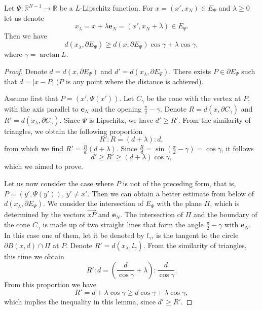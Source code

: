 \documentclass[10pt,a4paper]{amsart}
\begin{document}
\begin{lemma}\label{LE.DISTANCE.FROM.GRAPH}
Let $\Psi: \mathbb{R}^{N-1}\to\mathbb{R}$ be a $L$-Lipschitz function.   For $x = (x',x_N)\in E_\Psi$ and $\lambda\ge 0$
let us denote
\begin{equation*}
x_\lambda  =  x  + \lambda \mathbf {e}_N= (x', x_N + \lambda)\in E_\Psi.
\end{equation*}
Then we have
\begin{equation*}
d(x_\lambda, \partial E_\Psi) \ge d(x, \partial E_\Psi) \cos \gamma +  {\lambda\cos \gamma},
\end{equation*}
where  $\gamma  = \arctan L$.
\end{lemma}

\begin{proof}
Denote  $d  =  d(x, \partial E_\Psi)$   and   $d'= d(x_\lambda, \partial E_\Psi)$.   There exists $P\in \partial E_\Psi$
such that $ d = |x - P|$  ($P$ is any point where the distance is achieved).

Assume first that $P = (x', \Psi (x'))$. Let $C_\gamma$ be the cone with the vertex at  $P$,   with the axis parallel to
$\mathbf{e}_N$ and the opening $\frac {\pi}2-\gamma$.                          Denote $R = d(x, \partial C_\gamma) $ and
$R'= d(x_\lambda,  \partial C_\gamma)$.     Since $\Psi$ is Lipschitz,    we have $d'\ge  R'$.   From the similarity  of
triangles,  we obtain the following proportion
\begin{equation*}
R': R = (d+\lambda):d,
\end{equation*}
from which  we  find    $R'  = \frac R d (d+\lambda)$. Since $\frac Rd = \sin (\frac \pi 2 - \gamma) = \cos \gamma$,  it
follows
\begin{equation*}
d'\ge R'\ge (d +\lambda)\cos \gamma,
\end{equation*}
which we aimed to prove.

Let us now  consider the case where $P$ is not of the preceding form, that is, $P =(y', \Psi (y'))$, $y'\ne x'$. Then we
can    obtain a better estimate from below of $d(x_\lambda, \partial E_\Psi)$.  We consider the intersection of $E_\Psi$
with the plane  $\Pi$, which is determined by the vectors $\Vec{xP}$ and $\mathbf{e}_N$.  The intersection of  $\Pi$ and
the boundary of the cone $C_\gamma $ is made up of two straight lines that form the angle      $\frac \pi2-\gamma$  with
$\mathbf{e}_N$.  In  this case one of them, let it be denoted by $l_\gamma$,                is the tangent to the circle
$\partial B(x,d)\cap  \Pi$  at  $P$. Denote   $R' = d(x_\lambda, l_\gamma)$.  From the  similarity of  triangles,   this
time   we  obtain
\begin{equation*}
R': d  = \left(\frac d{\cos \gamma} +\lambda\right) : \frac d{\cos \gamma}.
\end{equation*}
From this proportion we have
\begin{equation*}
R' =  d + \lambda \cos \gamma\ge d \cos \gamma  + \lambda \cos\gamma,
\end{equation*}
which implies   the inequality in this  lemma, since   $d'\ge R'$.
\end{proof}
\end{document}
